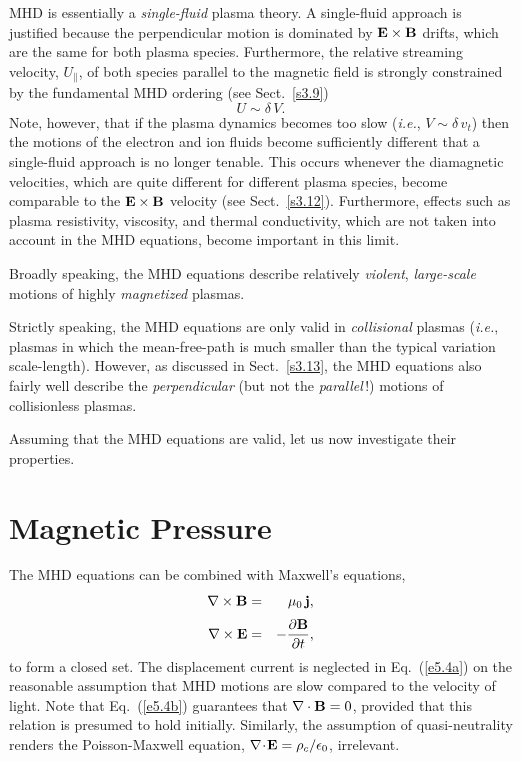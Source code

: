 MHD is essentially a {\em single-fluid}\/ plasma theory. A single-fluid
approach is justified because the perpendicular motion is dominated by
${\bf E}\times{\bf B}$ drifts, which are the same for both
plasma species. Furthermore, 
the relative streaming velocity, $U_\parallel$, of
both species parallel to the magnetic field is strongly constrained by the
fundamental MHD ordering (see Sect.~\ref{s3.9})
\begin{equation}
U \sim \delta \,V.
\end{equation}
Note, however, that if the plasma dynamics  becomes too slow 
({\em i.e.}, $V\sim \delta\,v_t$) then the motions of the electron
and ion fluids become sufficiently different that a single-fluid
approach is no longer tenable. This occurs whenever the diamagnetic
velocities, which are quite different for different plasma species, become
comparable to the ${\bf E}\times{\bf B}$ velocity (see Sect.~\ref{s3.12}).
Furthermore, effects such as plasma resistivity, viscosity, and thermal
conductivity, which are not taken into account in the MHD equations, become
important in this limit. 

Broadly speaking, the MHD equations describe relatively {\em violent}, 
{\em large-scale}\/
motions of highly {\em magnetized}\/ plasmas. 

Strictly speaking, the MHD equations are only valid in  {\em collisional}\/
plasmas ({\em i.e.},  plasmas in which the mean-free-path is much smaller
than the typical variation scale-length). However, as discussed in Sect.~\ref{s3.13},
the MHD equations also fairly well describe the {\em perpendicular}\/ (but not
the {\em parallel}\,!)  motions of  collisionless
plasmas.

Assuming that the MHD equations are valid, let us now investigate their properties.

\section{Magnetic Pressure}
The MHD equations can be combined with Maxwell's equations,
\begin{eqnarray}\label{e5.4a}
\nabla\times{\bf B} &=& \mu_0\,{\bf j},\\[0.5ex]
\nabla\times{\bf E} &=& - \frac{\partial{\bf B}}{\partial t},\label{e5.4b}
\end{eqnarray}
to form a closed set. The displacement current is neglected in
Eq.~(\ref{e5.4a}) on the reasonable assumption that MHD motions are slow
compared to the velocity of light. Note that Eq.~(\ref{e5.4b}) guarantees
that $\nabla\cdot{\bf B}=0$, provided that this relation is
presumed to hold initially. Similarly, the assumption of
quasi-neutrality renders the Poisson-Maxwell equation,
$\nabla\!\cdot\!{\bf E} = \rho_c/\epsilon_0$, irrelevant.

